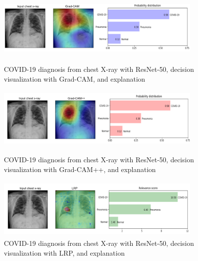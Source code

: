 \documentclass[conference]{IEEEtran}
\begin{document}
\begin{figure}
	\centering
    	\includegraphics[width=0.9\textwidth,height=30mm]{cam.png}
    	\caption{COVID-19 diagnosis from chest X-ray with ResNet-50, decision visualization with Grad-CAM, and explanation}
    	\label{Fig:ggcam_viz}
    	\smallskip
    	\includegraphics[width=0.9\textwidth,height=30mm]{cam_plus.png}
    	\caption{COVID-19 diagnosis from chest X-ray with ResNet-50, decision visualization with Grad-CAM++, and explanation}
    	\label{Fig:ggcam_plus_viz}
    	\smallskip
    	\includegraphics[width=0.9\textwidth,height=30mm]{lrp.png}
    	\caption{COVID-19 diagnosis from chest X-ray with ResNet-50, decision visualization with LRP, and explanation}
    	\label{Fig:lrp_viz}
    	\vspace{-2mm}
\end{figure}
\end{document}

